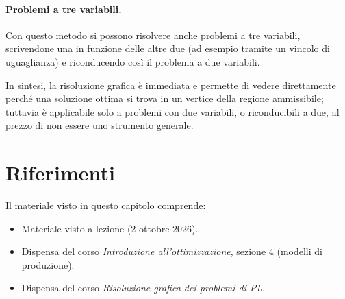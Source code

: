 \paragraph{Problemi a tre variabili.}
Con questo metodo si possono risolvere anche problemi a tre variabili, scrivendone una in funzione delle altre due (ad esempio tramite un vincolo di uguaglianza) e riconducendo così il problema a due variabili.

In sintesi, la risoluzione grafica è immediata e permette di vedere direttamente perché una soluzione ottima si trova in un vertice della regione ammissibile; tuttavia è applicabile solo a problemi con due variabili, o riconducibili a due, al prezzo di non essere uno strumento generale.

\section*{Riferimenti}
Il materiale visto in questo capitolo comprende:
\begin{itemize}
    \item Materiale visto a lezione (2 ottobre 2026).
    \item Dispensa del corso \emph{Introduzione all'ottimizzazione}, sezione 4 (modelli di produzione).
    \item Dispensa del corso \emph{Risoluzione grafica dei problemi di PL}.
\end{itemize}
